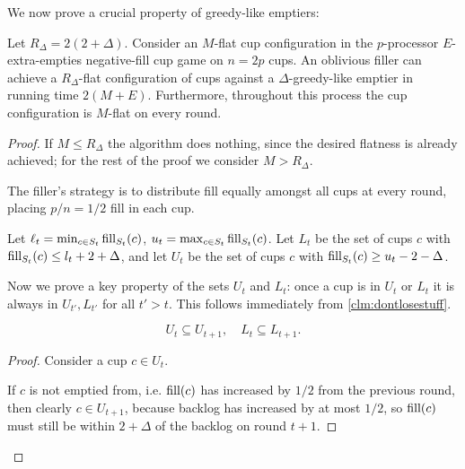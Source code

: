 We now prove a crucial property of greedy-like emptiers: 
\begin{lemma}
  \label{lem:greedylikeisflat}
  Let $R_\Delta = 2(2+\Delta)$.
  Consider an $M$-flat cup configuration in the $p$-processor
  $E$-extra-empties negative-fill cup game on $n = 2p$ cups. An
  oblivious filler can achieve a $R_\Delta$-flat configuration
  of cups against a $\Delta$-greedy-like emptier in running time
  $2(M+E)$. Furthermore, throughout this process the cup configuration
  is $M$-flat on every round.
\end{lemma}
\begin{proof}
  If $M \le R_\Delta$ the algorithm does nothing, since the
  desired flatness is already achieved; for
  the rest of the proof we consider $M > R_\Delta$.

  The filler's strategy is to distribute fill equally amongst all
  cups at every round, placing $p/n = 1/2$ fill in each cup. 

  Let $\ell_t = \min_{c\in S_t} \operatorname{\textnormal{fill}}_{S_t}(c)$, $u_t = \max_{c\in S_t} \operatorname{\textnormal{fill}}_{S_t}(c)$. 
  Let $L_t$ be the set of cups $c$ with $\operatorname{\textnormal{fill}}_{S_t}(c) \le l_t+2+\Delta$, and let
  $U_t$ be the set of cups $c$ with $\operatorname{\textnormal{fill}}_{S_t}(c) \ge u_t-2-\Delta$.

  Now we prove a key property of the sets $U_t$ and $L_t$: once a cup is in
  $U_t$ or $L_t$ it is always in $U_{t'}, L_{t'}$ for all $t' > t$. This
  follows immediately from \cref{clm:dontlosestuff}.
  \begin{clm}
    \label{clm:dontlosestuff}
    $$U_{t} \subseteq U_{t+1},\quad L_t \subseteq L_{t+1}.$$
  \end{clm}
  \begin{proof}
    Consider a cup $c\in U_t$.

    If $c$ is not emptied from, i.e. $\operatorname{\textnormal{fill}}(c)$ has increased by
    $1/2$ from the previous round, then
    clearly $c \in U_{t+1}$, because backlog has increased by at most $1/2$, so
    $\operatorname{\textnormal{fill}}(c)$ must still be within $2+\Delta$ of the backlog on round $t+1$. 


\end{proof}
\end{proof}
